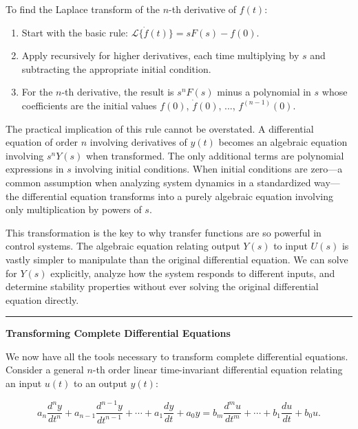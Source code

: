 \begin{algorithm}
To find the Laplace transform of the $n$-th derivative of $f(t)$:

\begin{enumerate}
\item Start with the basic rule: $\mathcal{L}\{\dot{f}(t)\} = s F(s) - f(0)$.
\item Apply recursively for higher derivatives, each time multiplying by $s$ and subtracting the appropriate initial condition.
\item For the $n$-th derivative, the result is $s^n F(s)$ minus a polynomial in $s$ whose coefficients are the initial values $f(0)$, $\dot{f}(0)$, ..., $f^{(n-1)}(0)$.
\end{enumerate}
\end{algorithm}

The practical implication of this rule cannot be overstated. A differential equation of order $n$ involving derivatives of $y(t)$ becomes an algebraic equation involving $s^n Y(s)$ when transformed. The only additional terms are polynomial expressions in $s$ involving initial conditions. When initial conditions are zero---a common assumption when analyzing system dynamics in a standardized way---the differential equation transforms into a purely algebraic equation involving only multiplication by powers of $s$.

This transformation is the key to why transfer functions are so powerful in control systems. The algebraic equation relating output $Y(s)$ to input $U(s)$ is vastly simpler to manipulate than the original differential equation. We can solve for $Y(s)$ explicitly, analyze how the system responds to different inputs, and determine stability properties without ever solving the original differential equation directly.

\vspace{1em}
\hrule
\vspace{0.5em}
\color{UofSCGarnet}\textbf{Transforming Complete Differential Equations}\color{UofSCBlack}
\vspace{0.5em}

We now have all the tools necessary to transform complete differential equations. Consider a general $n$-th order linear time-invariant differential equation relating an input $u(t)$ to an output $y(t)$:

\[
a_n \frac{d^n y}{dt^n} + a_{n-1} \frac{d^{n-1} y}{dt^{n-1}} + \cdots + a_1 \frac{dy}{dt} + a_0 y = b_m \frac{d^m u}{dt^m} + \cdots + b_1 \frac{du}{dt} + b_0 u.
\]

